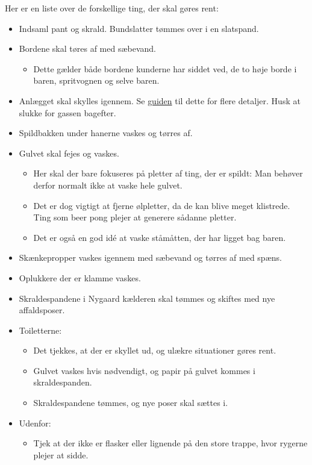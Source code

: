 Her er en liste over de forskellige ting, der skal gøres rent:
\begin{itemize}
	\item Indsaml pant og skrald. Bundslatter tømmes over i en slatspand.
	\item Bordene skal tøres af med sæbevand.
	\begin{itemize}
		\item Dette gælder både bordene kunderne har siddet ved, de to høje
			borde i baren, spritvognen og selve baren.
	\end{itemize}
	\item Anlægget skal skylles igennem. Se \href{https://media.fredagscafeen.dk/guides/rensningafanlaeg.pdf}{guiden} til dette for flere
	detaljer. Husk at slukke for gassen bagefter.
	\item Spildbakken under hanerne vaskes og tørres af.
	\item Gulvet skal fejes og vaskes.
	\begin{itemize}
		\item Her skal der bare fokuseres på pletter af ting, der er spildt:
			Man behøver derfor normalt ikke at vaske hele gulvet.
		\item Det er dog vigtigt at fjerne ølpletter, da de kan blive meget
			klistrede. Ting som beer pong plejer at generere sådanne pletter.
		\item Det er også en god idé at vaske ståmåtten, der har ligget bag baren.
	\end{itemize}
	\item Skænkepropper vaskes igennem med sæbevand og tørres af med spæns. 
	\item Oplukkere der er klamme vaskes.
	\item Skraldespandene i Nygaard kælderen skal tømmes og skiftes med nye affaldsposer.
	\item Toiletterne:
	\begin{itemize}
		\item Det tjekkes, at der er skyllet ud, og ulækre situationer gøres rent.
		\item Gulvet vaskes hvis nødvendigt, og papir på gulvet kommes i skraldespanden.
		\item Skraldespandene tømmes, og nye poser skal sættes i.
	\end{itemize}
	\item Udenfor:
	\begin{itemize}
		\item Tjek at der ikke er flasker eller lignende på den store trappe,
			hvor rygerne plejer at sidde.
	\end{itemize}
\end{itemize}
